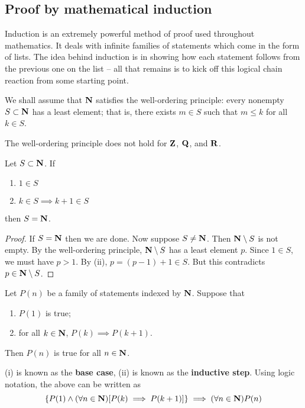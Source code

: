 \subsection{Proof by mathematical induction}
Induction is an extremely powerful method of proof used throughout mathematics. It deals with infinite families of statements which come in the form of lists. The idea behind induction is in showing how each statement follows from the previous one on the list -- all that remains is to kick off this logical chain reaction from some starting point.

We shall assume that $\mathbf N$ satisfies the well-ordering principle: every nonempty $S\subset\mathbf N$ has a least element; that is, there exists $m\in S$ such that $m\le k$ for all $k\in S$.

\begin{remark}
The well-ordering principle does not hold for $\mathbf Z$, $\mathbf Q$, and $\mathbf R$.
\end{remark}

\begin{lemma}
Let $S\subset\mathbf N$. If
\begin{enumerate}[label=(\roman*)]
\item $1\in S$
\item $k\in S\implies k+1\in S$
\end{enumerate}
then $S=\mathbf N$.
\end{lemma}

\begin{proof}
If $S=\mathbf N$ then we are done. Now suppose $S\neq\mathbf N$. Then $\mathbf N\setminus S$ is not empty. By the well-ordering principle, $\mathbf N\setminus S$ has a least element $p$. Since $1\in S$, we must have $p>1$. By (ii), $p=(p-1)+1\in S$. But this contradicts $p\in\mathbf N\setminus S$.
\end{proof}

\begin{theorem}
Let $P(n)$ be a family of statements indexed by $\mathbf N$. Suppose that 
\begin{enumerate}[label=(\roman*)]
\item $P(1)$ is true;
\item for all $k\in\mathbf N$, $P(k)\implies P(k+1)$.
\end{enumerate}
Then $P(n)$ is true for all $n\in\mathbf N$.
\end{theorem}

(i) is known as the \textbf{base case}, (ii) is known as the \textbf{inductive step}. Using logic notation, the above can be written as
\[ \{P(1) \land (\forall n \in \mathbf N) [P(k) \implies P(k+1)]\} \implies (\forall n \in \mathbf N)P(n) \]

